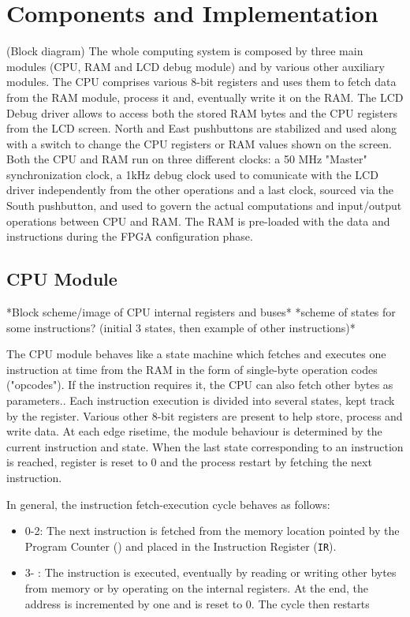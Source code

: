 \section{Components and Implementation} \label{sec:impl}
(Block diagram)
The whole computing system is composed by three main modules (CPU, RAM and LCD debug module)
and by various other auxiliary modules.
The CPU comprises various 8-bit registers and uses them to fetch data from the RAM module, process it and, eventually write it on the RAM.
The LCD Debug driver allows to access both the stored RAM bytes and the CPU registers from the LCD screen.
North and East pushbuttons are stabilized and used along with a switch to change the CPU registers or RAM values shown on the screen.
Both the CPU and RAM run on three different clocks: a 50 MHz "Master" synchronization clock,
 a 1kHz debug clock used to comunicate with the LCD driver independently from the other operations
 and a last clock, sourced via the South pushbutton, and used to govern the actual computations and input/output operations between CPU and RAM.
The RAM is pre-loaded with the data and instructions during the FPGA configuration phase.



\subsection{CPU Module}  \label{ssec:cpu}
*Block scheme/image of CPU internal registers and buses*
*scheme of states for some instructions? (initial 3 states, then example of other instructions)*

The CPU module behaves like a state machine which fetches and executes one instruction at time from the RAM in the form of single-byte operation codes ("opcodes").
If the instruction requires it, the CPU can also fetch other bytes as parameters..
Each instruction execution is divided into several states, kept track by the  register.
Various other 8-bit registers are present to help store, process and write data.
At each  edge risetime, the module behaviour is determined by the current instruction and state.
When the last state corresponding to an instruction is reached,  register is reset to 0 and the process
restart by fetching the next instruction.

In general, the instruction fetch-execution cycle behaves as follows:
\begin{itemize}
    \item {} 0-2: The next instruction is fetched from the memory location pointed by the Program Counter () and placed in the Instruction Register (\texttt{IR}).
    \item {} 3- : The instruction is executed, eventually by reading or writing other bytes from memory or by operating on the internal registers. At the end, the  address is incremented by one and  is reset to 0. The cycle then restarts
\end{itemize}


